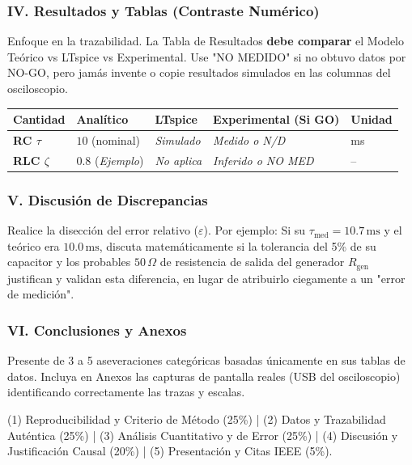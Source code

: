 \documentclass[11pt, a4paper]{article}
\begin{document}
\subsubsection*{IV. Resultados y Tablas (Contraste Numérico)}
Enfoque en la trazabilidad. La Tabla de Resultados \textbf{debe comparar} el Modelo Teórico vs LTspice vs Experimental. Use "NO MEDIDO" si no obtuvo datos por NO-GO, pero jamás invente o copie resultados simulados en las columnas del osciloscopio.

\vspace{0.15cm}
\renewcommand{\arraystretch}{1.3}
\noindent
\begin{tabularx}{\textwidth}{
  >{\bfseries\RaggedRight\hsize=1.1\hsize}X 
  >{\RaggedRight\arraybackslash\hsize=1.0\hsize}X 
  >{\RaggedRight\arraybackslash\hsize=1.0\hsize}X 
  >{\RaggedRight\arraybackslash\hsize=1.1\hsize}X 
  >{\RaggedRight\arraybackslash\hsize=0.8\hsize}X}
\toprule
\textbf{Cantidad} & \textbf{Analítico} & \textbf{LTspice} & \textbf{Experimental (Si GO)} & \textbf{Unidad} \\
\midrule
RC $\tau$     & $10$ (nominal) & \textit{Simulado} & \textit{Medido o N/D} & ms \\
RLC $\zeta$   & $0.8$ (\textit{Ejemplo}) & \textit{No aplica} & \textit{Inferido o NO MED} & -- \\
\bottomrule
\end{tabularx}

\subsubsection*{V. Discusión de Discrepancias}
Realice la disección del error relativo ($\varepsilon$). Por ejemplo: Si su $\tau_{\text{med}} = 10.7\,\text{ms}$ y el teórico era $10.0\,\text{ms}$, discuta matemáticamente si la tolerancia del 5\% de su capacitor y los probables $50\,\Omega$ de resistencia de salida del generador $R_{\text{gen}}$ justifican y validan esta diferencia, en lugar de atribuirlo ciegamente a un "error de medición".

\subsubsection*{VI. Conclusiones y Anexos}
Presente de 3 a 5 aseveraciones categóricas basadas únicamente en sus tablas de datos. Incluya en Anexos las capturas de pantalla reales (USB del osciloscopio) identificando correctamente las trazas y escalas.

\vspace{0.3cm}
\begin{tcolorbox}[colback=gray!5, colframe=black, title=\textbf{Pauta de Evaluación Editorial Propuesta (30\% de EC3)}]
\small (1) Reproducibilidad y Criterio de Método (25\%) | (2) Datos y Trazabilidad Auténtica (25\%) | (3) Análisis Cuantitativo y de Error (25\%) | (4) Discusión y Justificación Causal (20\%) | (5) Presentación y Citas IEEE (5\%).
\end{tcolorbox}
\end{document}
